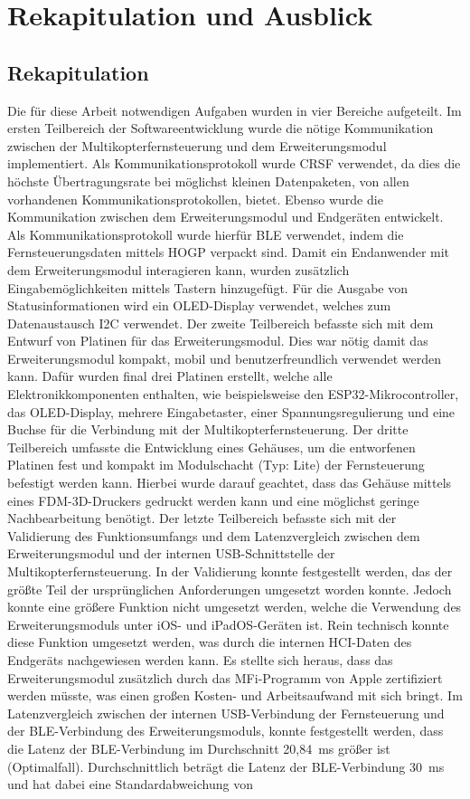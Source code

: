 
\chapter{Rekapitulation und Ausblick}
\section{Rekapitulation}
Die für diese Arbeit notwendigen Aufgaben wurden in vier Bereiche aufgeteilt. Im ersten Teilbereich der Softwareentwicklung wurde die nötige Kommunikation zwischen der Multikopterfernsteuerung und dem Erweiterungsmodul implementiert. Als Kommunikationsprotokoll wurde CRSF verwendet, da dies die höchste Übertragungsrate bei möglichst kleinen Datenpaketen, von allen vorhandenen Kommunikationsprotokollen, bietet. Ebenso wurde die Kommunikation zwischen dem Erweiterungsmodul und Endgeräten entwickelt. Als Kommunikationsprotokoll wurde hierfür \ac{BLE} verwendet, indem die Fernsteuerungsdaten mittels \ac{HOGP} verpackt sind. Damit ein Endanwender mit dem Erweiterungsmodul interagieren kann, wurden zusätzlich Eingabemöglichkeiten mittels Tastern hinzugefügt. Für die Ausgabe von Statusinformationen wird ein \ac{OLED}-Display verwendet, welches zum Datenaustausch \ac{I2C} verwendet. Der zweite Teilbereich befasste sich mit dem Entwurf von Platinen für das Erweiterungsmodul. Dies war nötig damit das Erweiterungsmodul kompakt, mobil und benutzerfreundlich verwendet werden kann. Dafür wurden final drei Platinen erstellt, welche alle Elektronikkomponenten enthalten, wie beispielsweise den ESP32-Mikrocontroller, das \ac{OLED}-Display, mehrere Eingabetaster, einer Spannungsregulierung und eine Buchse für die Verbindung mit der Multikopterfernsteuerung. Der dritte Teilbereich umfasste die Entwicklung eines Gehäuses, um die entworfenen Platinen fest und kompakt im Modulschacht (Typ: Lite) der Fernsteuerung befestigt werden kann. Hierbei wurde darauf geachtet, dass das Gehäuse mittels eines \ac{FDM}-3D-Druckers gedruckt werden kann und eine möglichst geringe Nachbearbeitung benötigt. Der letzte Teilbereich befasste sich mit der Validierung des Funktionsumfangs und dem Latenzvergleich zwischen dem Erweiterungsmodul und der internen USB-Schnittstelle der Multikopterfernsteuerung. In der Validierung konnte festgestellt werden, das der größte Teil der ursprünglichen Anforderungen umgesetzt worden konnte. Jedoch konnte eine größere Funktion nicht umgesetzt werden, welche die Verwendung des Erweiterungsmoduls unter iOS- und iPadOS-Geräten ist. Rein technisch konnte diese Funktion umgesetzt werden, was durch die internen \ac{HCI}-Daten des Endgeräts nachgewiesen werden kann. Es stellte sich heraus, dass das Erweiterungsmodul zusätzlich durch das \ac{MFi}-Programm von Apple zertifiziert werden müsste, was einen großen Kosten- und Arbeitsaufwand mit sich bringt. Im Latenzvergleich zwischen der internen USB-Verbindung der Fernsteuerung und der \ac{BLE}-Verbindung des Erweiterungsmoduls, konnte festgestellt werden, dass die Latenz der \ac{BLE}-Verbindung im Durchschnitt 20,84~ms größer ist (Optimalfall). Durchschnittlich beträgt die Latenz der \ac{BLE}-Verbindung 30~ms und hat dabei eine Standardabweichung von 